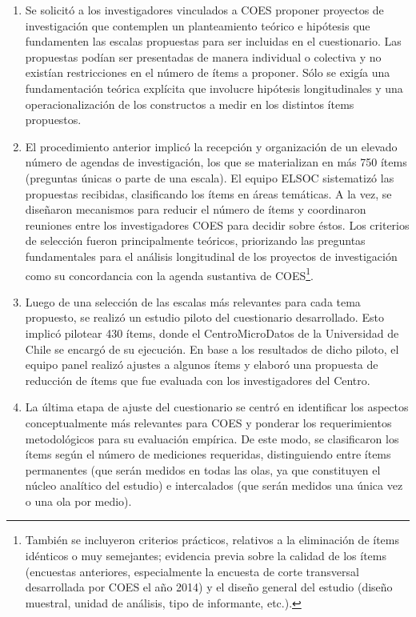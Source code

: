 \documentclass[
  openany]{book}
\begin{document}
\begin{enumerate}
\def\labelenumi{\arabic{enumi}.}
\item
  Se solicitó a los investigadores vinculados a COES proponer proyectos de investigación que contemplen un planteamiento teórico e hipótesis que fundamenten las escalas propuestas para ser incluidas en el cuestionario. Las propuestas podían ser presentadas de manera individual o colectiva y no existían restricciones en el número de ítems a proponer. Sólo se exigía una fundamentación teórica explícita que involucre hipótesis longitudinales y una operacionalización de los constructos a medir en los distintos ítems propuestos.
\item
  El procedimiento anterior implicó la recepción y organización de un elevado número de agendas de investigación, los que se materializan en más 750 ítems (preguntas únicas o parte de una escala). El equipo ELSOC sistematizó las propuestas recibidas, clasificando los ítems en áreas temáticas. A la vez, se diseñaron mecanismos para reducir el número de ítems y coordinaron reuniones entre los investigadores COES para decidir sobre éstos. Los criterios de selección fueron principalmente teóricos, priorizando las preguntas fundamentales para el análisis longitudinal de los proyectos de investigación como su concordancia con la agenda sustantiva de COES\footnote{También se incluyeron criterios prácticos, relativos a la eliminación de ítems idénticos o muy semejantes; evidencia previa sobre la calidad de los ítems (encuestas anteriores, especialmente la encuesta de corte transversal desarrollada por COES el año 2014) y el diseño general del estudio (diseño muestral, unidad de análisis, tipo de informante, etc.).}.
\item
  Luego de una selección de las escalas más relevantes para cada tema propuesto, se realizó un estudio piloto del cuestionario desarrollado. Esto implicó pilotear 430 ítems, donde el CentroMicroDatos de la Universidad de Chile se encargó de su ejecución. En base a los resultados de dicho piloto, el equipo panel realizó ajustes a algunos ítems y elaboró una propuesta de reducción de ítems que fue evaluada con los investigadores del Centro.
\item
  La última etapa de ajuste del cuestionario se centró en identificar los aspectos conceptualmente más relevantes para COES y ponderar los requerimientos metodológicos para su evaluación empírica. De este modo, se clasificaron los ítems según el número de mediciones requeridas, distinguiendo entre ítems permanentes (que serán medidos en todas las olas, ya que constituyen el núcleo analítico del estudio) e intercalados (que serán medidos una única vez o una ola por medio).
\end{enumerate}
\end{document}
